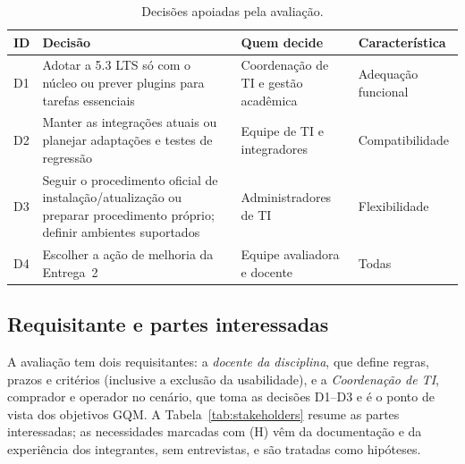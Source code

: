 \documentclass[12pt]{article}
\newcommand{\tabfonte}[1]{\par\vspace{2pt}{\footnotesize Fonte: #1}}
\begin{document}
\begin{table}[!ht]
\centering
\caption{Decisões apoiadas pela avaliação.}
\label{tab:decisoes}
\scriptsize
\begin{tabularx}{\linewidth}{p{0.6cm}Lp{2.6cm}p{2.4cm}}
\toprule
\textbf{ID} & \textbf{Decisão} & \textbf{Quem decide} & \textbf{Característica} \\
\midrule
D1 & Adotar a 5.3 LTS só com o núcleo ou prever plugins para tarefas essenciais & Coordenação de TI e gestão acadêmica & Adequação funcional \\
D2 & Manter as integrações atuais ou planejar adaptações e testes de regressão & Equipe de TI e integradores & Compatibilidade \\
D3 & Seguir o procedimento oficial de instalação/atualização ou preparar procedimento próprio; definir ambientes suportados & Administradores de TI & Flexibilidade \\
D4 & Escolher a ação de melhoria da Entrega~2 & Equipe avaliadora e docente & Todas \\
\bottomrule
\end{tabularx}
\tabfonte{elaboração própria.}
\end{table}

\subsection{Requisitante e partes interessadas}

A avaliação tem dois requisitantes: a \emph{docente da disciplina}, que define regras, prazos e critérios (inclusive a exclusão da usabilidade), e a \emph{Coordenação de TI}, comprador e operador no cenário, que toma as decisões D1--D3 e é o ponto de vista dos objetivos GQM. A Tabela~\ref{tab:stakeholders} resume as partes interessadas; as necessidades marcadas com (H) vêm da documentação e da experiência dos integrantes, sem entrevistas, e são tratadas como hipóteses.
\end{document}
